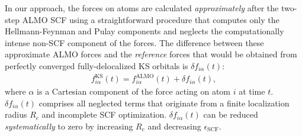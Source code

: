 \documentclass[aps,prl,reprint,amsmath,amssymb]{revtex4-1}
\begin{document}
In our approach, the forces on atoms are calculated \emph{approximately} after the two-step ALMO SCF using a straightforward procedure that computes only the Hellmann-Feynman and Pulay components and neglects the computationally intense non-SCF component of the forces. 
The difference between these approximate ALMO forces and the \emph{reference} forces that would be obtained from perfectly converged fully-delocalized KS orbitals is $\delta f_{i\alpha}(t)$:
%
\begin{align}
\label{eq:deltaf}
f^{\text{KS}}_{i\alpha}(t) = f^{\text{ALMO}}_{i\alpha}(t) + \delta f_{i\alpha} (t),
\end{align}
%
where $\alpha$ is a Cartesian component of the force acting on atom $i$ at time $t$. $\delta f_{i\alpha} (t)$ comprises all neglected terms that originate from a finite localization radius $R_c$ and incomplete SCF optimization. 
$\delta f_{i\alpha} (t)$ can be reduced \emph{systematically} to zero by increasing $R_c$ and decreasing $\epsilon_{\text{SCF}}$. %

\end{document}
